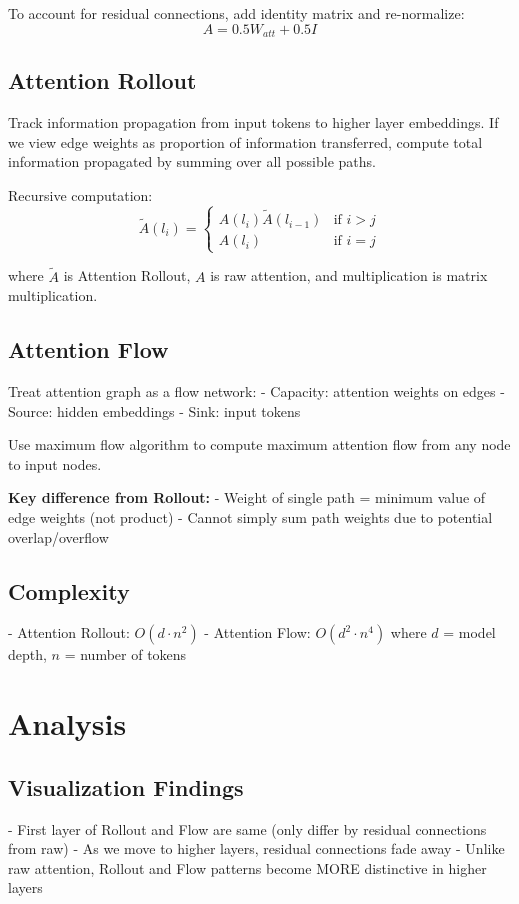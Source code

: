 To account for residual connections, add identity matrix and re-normalize:
\begin{equation}
A = 0.5W_{att} + 0.5I
\end{equation}

\subsection{Attention Rollout}
Track information propagation from input tokens to higher layer embeddings. If we view edge weights as proportion of information transferred, compute total information propagated by summing over all possible paths.

Recursive computation:
\begin{equation}
\tilde{A}(l_i) = \begin{cases}
A(l_i)\tilde{A}(l_{i-1}) & \text{if } i > j \\
A(l_i) & \text{if } i = j
\end{cases}
\end{equation}

where $\tilde{A}$ is Attention Rollout, $A$ is raw attention, and multiplication is matrix multiplication.

\subsection{Attention Flow}
Treat attention graph as a flow network:
- Capacity: attention weights on edges
- Source: hidden embeddings
- Sink: input tokens

Use maximum flow algorithm to compute maximum attention flow from any node to input nodes.

\textbf{Key difference from Rollout:}
- Weight of single path = minimum value of edge weights (not product)
- Cannot simply sum path weights due to potential overlap/overflow

\subsection{Complexity}
- Attention Rollout: $O(d \cdot n^2)$
- Attention Flow: $O(d^2 \cdot n^4)$
where $d$ = model depth, $n$ = number of tokens

\section{Analysis}

\subsection{Visualization Findings}
- First layer of Rollout and Flow are same (only differ by residual connections from raw)
- As we move to higher layers, residual connections fade away
- Unlike raw attention, Rollout and Flow patterns become MORE distinctive in higher layers


